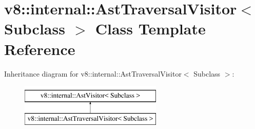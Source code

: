 \hypertarget{classv8_1_1internal_1_1AstTraversalVisitor}{}\section{v8\+:\+:internal\+:\+:Ast\+Traversal\+Visitor$<$ Subclass $>$ Class Template Reference}
\label{classv8_1_1internal_1_1AstTraversalVisitor}
Inheritance diagram for v8\+:\+:internal\+:\+:Ast\+Traversal\+Visitor$<$ Subclass $>$\+:\begin{figure}[H]
\begin{center}
\leavevmode
\includegraphics[height=2.000000cm]{classv8_1_1internal_1_1AstTraversalVisitor}
\end{center}
\end{figure}
